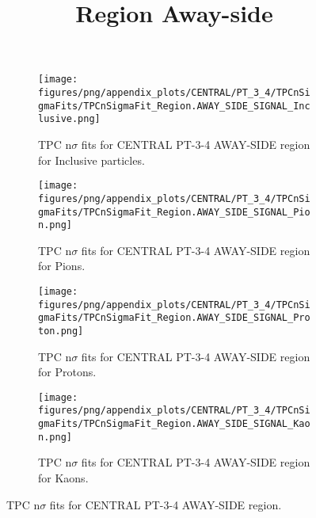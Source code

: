             \begin{figure}[H]
                \title{Region Away-side}
                \begin{subfigure}[b]{0.5\textwidth}
                    \centering
                    \texttt{[image: figures/png/appendix\_plots/CENTRAL/PT\_3\_4/TPCnSigmaFits/TPCnSigmaFit\_Region.AWAY\_SIDE\_SIGNAL\_Inclusive.png]}
                    \caption{TPC n$\sigma$ fits for CENTRAL PT-3-4 AWAY-SIDE region for Inclusive particles.}
                    \label{fig:appendix_CENTRAL_PT-3-4_AWAY_SIDE_SIGNAL_Inclusive}
                \end{subfigure}
                \begin{subfigure}[b]{0.5\textwidth}
                    \centering
                    \texttt{[image: figures/png/appendix\_plots/CENTRAL/PT\_3\_4/TPCnSigmaFits/TPCnSigmaFit\_Region.AWAY\_SIDE\_SIGNAL\_Pion.png]}
                    \caption{TPC n$\sigma$ fits for CENTRAL PT-3-4 AWAY-SIDE region for Pions.}
                    \label{fig:appendix_CENTRAL_PT-3-4_AWAY_SIDE_SIGNAL_Pion}
                \end{subfigure}
                \begin{subfigure}[b]{0.5\textwidth}
                    \centering
                    \texttt{[image: figures/png/appendix\_plots/CENTRAL/PT\_3\_4/TPCnSigmaFits/TPCnSigmaFit\_Region.AWAY\_SIDE\_SIGNAL\_Proton.png]}
                    \caption{TPC n$\sigma$ fits for CENTRAL PT-3-4 AWAY-SIDE region for Protons.}
                    \label{fig:appendix_CENTRAL_PT-3-4_AWAY_SIDE_SIGNAL_Proton}
                \end{subfigure}
                \begin{subfigure}[b]{0.5\textwidth}
                    \centering
                    \texttt{[image: figures/png/appendix\_plots/CENTRAL/PT\_3\_4/TPCnSigmaFits/TPCnSigmaFit\_Region.AWAY\_SIDE\_SIGNAL\_Kaon.png]}
                    \caption{TPC n$\sigma$ fits for CENTRAL PT-3-4 AWAY-SIDE region for Kaons.}
                    \label{fig:appendix_CENTRAL_PT-3-4_AWAY_SIDE_SIGNAL_Kaon}
                \end{subfigure}
                \caption{TPC n$\sigma$ fits for CENTRAL PT-3-4 AWAY-SIDE region.}
                \label{fig:appendix_CENTRAL_PT-3-4_AWAY_SIDE_SIGNAL}
            \end{figure}
